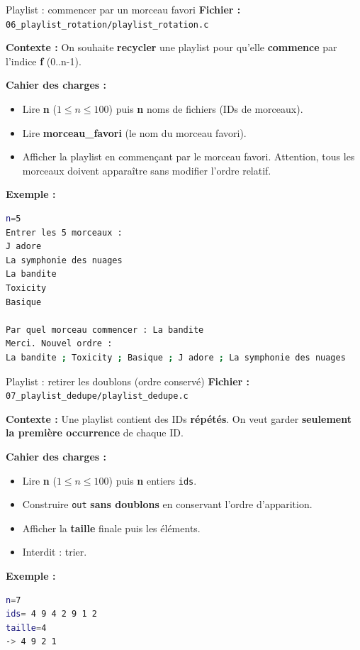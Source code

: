 \begin{UPSTIManipulation}{Playlist : commencer par un morceau favori}
  \textbf{Fichier :} \texttt{06\_playlist\_rotation/playlist\_rotation.c}

  \textbf{Contexte :} On souhaite \textbf{recycler} une playlist pour qu'elle \textbf{commence} par l'indice \textbf{f} (0..n-1).

  \textbf{Cahier des charges :}
  \begin{itemize}
    \item Lire \textbf{n} ($1\le n \le 100$) puis \textbf{n} noms de fichiers (IDs de morceaux).
    \item Lire \textbf{morceau\_favori} (le nom du morceau favori).
    \item Afficher la playlist en commençant par le morceau favori. Attention, tous les morceaux doivent apparaître sans modifier l'ordre relatif.
  \end{itemize}

  \textbf{Exemple :}
  \begin{lstlisting}[language=bash]
n=5
Entrer les 5 morceaux :
J adore
La symphonie des nuages
La bandite
Toxicity
Basique

Par quel morceau commencer : La bandite
Merci. Nouvel ordre :
La bandite ; Toxicity ; Basique ; J adore ; La symphonie des nuages
  \end{lstlisting}

\end{UPSTIManipulation}


\begin{UPSTIManipulation}{Playlist : retirer les doublons (ordre conservé)}
  \textbf{Fichier :} \texttt{07\_playlist\_dedupe/playlist\_dedupe.c}

  \textbf{Contexte :} Une playlist contient des IDs \textbf{répétés}. On veut garder \textbf{seulement la première occurrence} de chaque ID.

  \textbf{Cahier des charges :}
  \begin{itemize}
    \item Lire \textbf{n} ($1\le n \le 100$) puis \textbf{n} entiers \texttt{ids}.
    \item Construire \texttt{out} \textbf{sans doublons} en conservant l'ordre d'apparition.
    \item Afficher la \textbf{taille} finale puis les éléments.
    \item Interdit : trier.
  \end{itemize}

  \textbf{Exemple :}
  \begin{lstlisting}[language=bash]
n=7
ids= 4 9 4 2 9 1 2
taille=4
-> 4 9 2 1
  \end{lstlisting}
\end{UPSTIManipulation}


